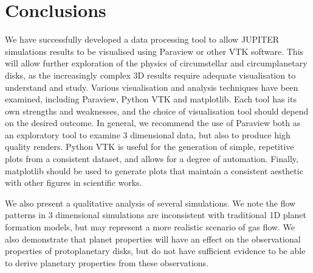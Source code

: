 \documentclass[preprint2]{aastex62}
\begin{document}


\section{Conclusions}\label{sec:con}
We have successfully developed a data processing tool to allow JUPITER simulations results to be visualised using Paraview or other VTK software. This will allow further exploration of the physics of circumstellar and circumplanetary disks, as the increasingly complex 3D results require adequate visualisation to understand and study. 
Various visualisation and analysis techniques have been examined, including Paraview, Python VTK and matplotlib. 
Each tool has its own strengths and weaknesses, and the choice of visualisation tool should depend on the desired outcome.
In general, we recommend the use of Paraview both as an exploratory tool to examine 3 dimensional data, but also to produce high quality renders. 
Python VTK is useful for the generation of simple, repetitive plots from a consistent dataset, and allows for a degree of automation. 
Finally, matplotlib should be used to generate plots that maintain a consistent aesthetic with other figures in scientific works.

We also present a qualitative analysis of several simulations. 
We note the flow patterns in 3 dimensional simulations are inconsistent with traditional 1D planet formation models, but may represent a more realistic scenario of gas flow.
We also demonstrate that planet properties will have an effect on the observational properties of protoplanetary disks, but do not have sufficient evidence to be able to derive planetary properties from these observations.
\end{document}
